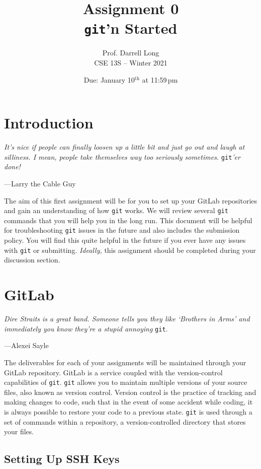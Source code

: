 \documentclass[11pt]{article}
\title{Assignment 0 \\ \texttt{git}'n Started}
\author{Prof. Darrell Long \\ CSE 13S -- Winter 2021}
\date{Due: January 10$^\text{th}$ at 11:59\,pm}
\begin{document}
\maketitle

\section{Introduction}

\textwidth
\epigraph{\emph{It's nice if people can finally loosen up a little bit
and just go out and laugh at silliness. I mean, people take themselves
way too seriously sometimes.}  \texttt{git}\emph{'er done!}}{---Larry the
Cable Guy}

\noindent The aim of this first assignment will be for you to set up your
GitLab repositories and gain an understanding of how \texttt{git} works.
We will review several \texttt{git} commands that you will help you in the long
run. This document will be helpful for troubleshooting \texttt{git} issues in
the future and also includes the submission policy. You will find this quite
helpful in the future if you ever have any issues with \texttt{git} or
submitting. \emph{Ideally,} this assignment should be completed during your
discussion section.

\section{GitLab}

\epigraph{\emph{Dire Straits is a great band. Someone tells you they like
`Brothers in Arms' and immediately you know they're a stupid annoying}
\texttt{git}.}{---Alexei Sayle}

\noindent The deliverables for each of your assignments will be maintained
through your GitLab repository. GitLab is a service coupled with the
version-control capabilities of \texttt{git}. \texttt{git} allows you to
maintain multiple versions of your source files, also known as version control.
Version control is the practice of tracking and making changes to code, such
that in the event of some accident while coding, it is always possible to
restore your code to a previous state. \texttt{git} is used
through a set of commands within a repository, a version-controlled directory
that stores your files.

\subsection{Setting Up SSH Keys}
\end{document}
